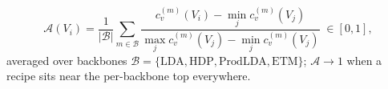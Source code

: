 
\begin{equation}\label{eq:affinity}
\mathcal{A}(V_i)=\frac{1}{|\mathcal{B}|}\sum_{m\in\mathcal{B}}
\frac{c_v^{(m)}(V_i)-\min_j c_v^{(m)}(V_j)}{\max_j c_v^{(m)}(V_j)-\min_j c_v^{(m)}(V_j)}\;\in[0,1],
\end{equation}
averaged over backbones $\mathcal{B}=\{\mathrm{LDA},\mathrm{HDP},\mathrm{ProdLDA},\mathrm{ETM}\}$;
$\mathcal{A}\to 1$ when a recipe sits near the per-backbone top everywhere.
